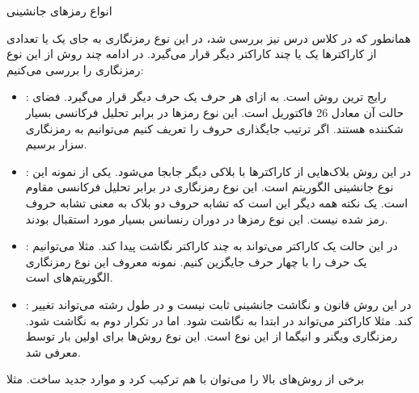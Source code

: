 \Problem
{انواع رمز‌های جانشینی}
{
همانطور که در کلاس درس نیز بررسی شد، در این نوع رمزنگاری به جای یک یا تعدادی از کاراکترها یک یا چند کاراکتر دیگر قرار می‌گیرد. در ادامه چند روش از این نوع رمزنگاری را بررسی می‌کنیم:

\begin{itemize}
    \item {}:
    رایج ترین روش است. به ازای هر حرف یک حرف دیگر قرار می‌گیرد. فضای حالت آن معادل 26 فاکتوریل است. این نوع رمزها در برابر تحلیل فرکانسی بسیار شکننده هستند. اگر ترتیب جایگذاری حروف را تعریف کنیم می‌توانیم به رمزنگاری سزار برسیم.
    
    \item {}:
    در این روش بلاک‌هایی از کاراکترها با بلاکی دیگر جابجا می‌شود. یکی از نمونه این نوع جانشینی الگوریتم
    است.
    این نوع رمزنگاری در برابر تحلیل فرکانسی مقاوم است. یک نکته همه دیگر این است که تشابه حروف دو بلاک به معنی تشابه حروف رمز شده نیست.
    این نوع رمزها در دوران رنسانس بسیار مورد استقبال بودند.
    
    \item {}:
    در این حالت یک کاراکتر می‌تواند به چند کاراکتر نگاشت پیدا کند. مثلا می‌توانیم یک حرف را با چهار حرف جایگزین کنیم.
    نمونه معروف این نوع رمزنگاری الگوریتم‌های
    است.
    
    \item {}:
    در این روش قانون و نگاشت جانشینی ثابت نیست و در طول رشته می‌تواند تغییر کند. مثلا کاراکتر
    می‌تواند در ابتدا به
    نگاشت شود.
    اما در تکرار دوم
    به
    نگاشت شود.
    رمزنگاری ویگنر و انیگما از این نوع است.
    این نوع روش‌ها برای اولین بار توسط
    معرفی شد.
\end{itemize}

برخی از روش‌های بالا را می‌توان با هم ترکیب کرد و موارد جدید ساخت.
مثلا
}
